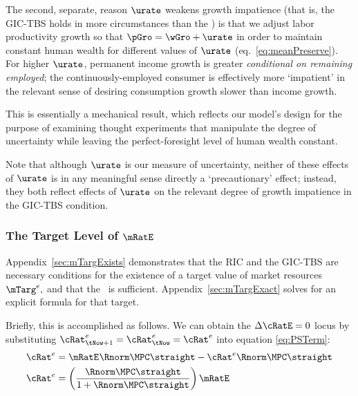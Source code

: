 \documentclass{handout}
\begin{document}
The second, separate, reason $\urate$ weakens growth impatience (that is, the GIC-TBS holds in more circumstances than the \GICWGro) is that we adjust labor productivity growth so that $\pGro=\wGro+\urate$ in 
order to maintain constant human wealth for different values of
$\urate$ (eq.\ \eqref{eq:meanPreserve}).  For higher
$\urate$, permanent income growth is greater {\it conditional on
  remaining employed}; the continuously-employed consumer is effectively
more `impatient' in the relevant sense of desiring consumption growth
slower than income growth.

This is essentially a mechanical result, which reflects our model's
design for the purpose of examining thought experiments that
manipulate the degree of uncertainty while leaving the
perfect-foresight level of human wealth constant.  

Note that although $\urate$ is our measure of uncertainty, neither of 
these effects of $\urate$ is in any meaningful sense directly a 
`precautionary' effect; instead, they both reflect effects of 
$\urate$ on the relevant degree of growth impatience in the GIC-TBS 
condition.  

\subsubsection{The Target Level of $\mRatE$}
\renewcommand{\tSS}{\null}

Appendix~\ref{sec:mTargExists} demonstrates that the RIC and the GIC-TBS are necessary conditions for the existence of a target value of market resources $\mTarg^{e},$ and that the \GICPGro~is sufficient.   Appendix~\ref{sec:mTargExact} solves for an explicit formula for that target.

Briefly, this is accomplished as follows.  We can obtain the $\dcEqZero$ locus by substituting
${\cRat}^{e}_{\tNow+1}={\cRat}^{e}_{\tNow}={\cRat}^{e}$ into equation \eqref{eq:PSTerm}:
\begin{equation}\begin{gathered}\begin{aligned}
  {\cRat}^{e}_{\tSS} & =  \mRatE_{\tSS} \Rnorm\MPCU\straight - {\cRat}^{e}_{\tSS} \Rnorm\MPCU\straight
\\  {\cRat}^{e}_{\tSS} & =  \left(\frac{\Rnorm\MPCU\straight}{1+\Rnorm\MPCU\straight}\right)\mRatE
  \label{eq:cDelEqZero} %
\end{aligned}\end{gathered}\end{equation}
\end{document}
